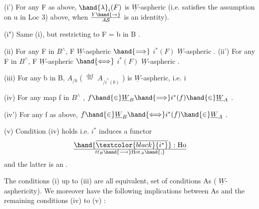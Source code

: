 (i') For any F as above, $\hand{\lambda}_i(F)$ is $\underline{W}$-aspheric (i.e. satisfies the
assumption on u in Loc 3) above, when $Y\hand{\to}\over{A}{\mathcal{S}}$ is an identity).

(i") Same  (i), but restricting to F = b in B .

(ii) For any F in $B^{\wedge}$, F $\underline{W}$-aspheric $\hand{\Longrightarrow}$ $i^{*}(F)$ $\underline{W}$-aspheric .
(ii') For any F in $B^{\wedge}$, F $\underline{W}$-aspheric $\hand{\Longleftrightarrow}$ $i^{*}(F)$ $\underline{W}$-aspheric .

(iii) For any b in B, $A_{/b}$ ( $\overset{\text{def}}{=}$ $A_{/i^*(b)}$ ) is $\underline{W}$-aspheric, i.e. i 

(iv) For any map f in $B^{\wedge}$ , $f \hand{\in} \underline{W}_B \hand{\Longrightarrow} i^{*}(f) \hand{\in} \underline{W}_A$ .

(iv') For any f as above, $f \hand{\in} \underline{W}_B \hand{\Longleftrightarrow} i^{*}(f) \hand{\in} \underline{W}_A$ .

(v) Condition (iv) holds i.e. $i^{*}$ induces a functor
\[ \hand{\overline{\textcolor{black}{i^{*}}}} : \mathrm{Ho}\over{t}{t}_B \hand{\longrightarrow} \mathrm{Hot}_A \hand{,} \]
and  the latter is an \hand{\uline{\textcolor{black}{equivalence}}}.

The conditions (i) up to (iii) are all equivalent,  
 set of conditions \hand{(}As\hand{)} ( $\underline{W}$-asphericity). We moreover have the
following implications between \hand{(}As\hand{)} and the remaining conditions (iv) to
(v) :

